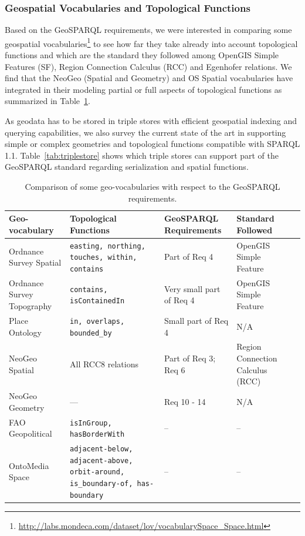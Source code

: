 \subsubsection{Geospatial Vocabularies and Topological Functions}
\label{sec:topofunc}

Based on the GeoSPARQL requirements, we were interested in comparing some geospatial vocabularies\footnote{\url{http://labs.mondeca.com/dataset/lov/vocabularySpace_Space.html}} to see how far they take already into account topological functions and which are the standard they followed among OpenGIS Simple Features (SF), Region Connection Calculus (RCC) and Egenhofer relations. We find that the NeoGeo (Spatial and Geometry) and OS Spatial vocabularies have integrated in their modeling partial or full aspects of topological functions as summarized in Table~\ref{tab:geosparql}.

As geodata has to be stored in triple stores with efficient geospatial indexing and querying capabilities, we also survey the current state of the art  in supporting simple or complex geometries and topological functions compatible with SPARQL 1.1. Table~\ref{tab:triplestore} shows which triple stores can support part of the GeoSPARQL standard regarding serialization and spatial functions.
\begin{table}
\begin{tabularx}{\textwidth}{|X|X|X|X|l}
\hline
\textbf{Geo-vocabulary} & \textbf{Topological Functions} & \textbf{GeoSPARQL Requirements} & \textbf{Standard Followed}\\
\hline
Ordnance Survey Spatial & \texttt{easting, northing, touches, within, contains} & Part of Req 4 & OpenGIS Simple Feature\\ \hline
Ordnance Survey Topography & \texttt{contains, isContainedIn} & Very small part of Req 4 & OpenGIS Simple Feature\\ \hline
Place Ontology & \texttt{in, overlaps, bounded\_by} & Small part of Req 4 & N/A\\
\hline
NeoGeo Spatial & All RCC8 relations & Part of Req 3; Req 6 & Region Connection Calculus (RCC)\\
\hline
NeoGeo Geometry & --- & Req 10 - 14 & N/A\\
\hline
FAO Geopolitical & \texttt{isInGroup, hasBorderWith} & -- & --\\
\hline
OntoMedia Space & \texttt{adjacent-below, adjacent-above, orbit-around, is\_boundary-of, has-boundary} & -- & --\\
\hline
\end{tabularx}
\caption{Comparison of some geo-vocabularies with respect to the GeoSPARQL requirements.}
\label{tab:geosparql}
\end{table}

